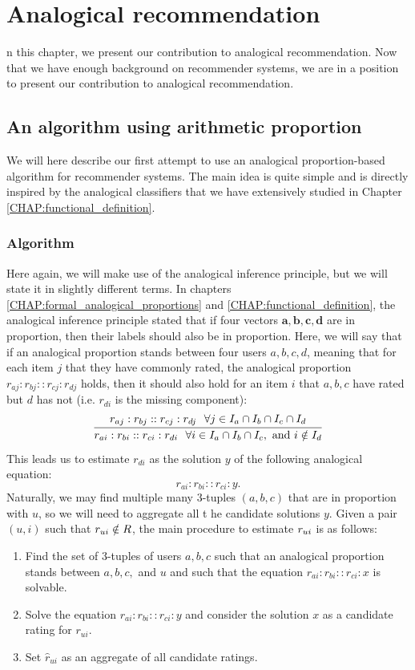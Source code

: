 \chapter{Analogical recommendation}
\label{CHAP:analogical_recommendation}

n this chapter, we present our contribution to analogical
recommendation. Now that we have enough background on recommender systems, we
are in a position to present our contribution to analogical recommendation.  

\section{An algorithm using arithmetic proportion}
\label{SEC:analogical_reco_basic_algo}
We will here describe our first attempt to use an analogical proportion-based
algorithm for recommender systems. The main idea is quite simple and is
directly inspired by the analogical classifiers that we have extensively
studied in Chapter \ref{CHAP:functional_definition}.
\subsection{Algorithm}

Here again, we will make use of the analogical inference principle, but we will
state it in slightly different terms. In chapters
\ref{CHAP:formal_analogical_proportions} and \ref{CHAP:functional_definition},
the analogical inference principle stated that if four vectors $\mathbf{a},
\mathbf{b}, \mathbf{c}, \mathbf{d}$ are in proportion, then their labels should
also be in proportion.  Here, we will say that if an analogical proportion
stands between four users $a, b, c, d$, meaning that for each item $j$ that
they have commonly rated, the analogical proportion $r_{aj} : r_{bj} :: r_{cj}
: r_{dj}$ holds, then it should also hold for an item $i$ that $a, b, c$ have
rated but $d$ has not (i.e. $r_{di}$ is the missing component):
$$
\infer{
r_{ai} : r_{bi} :: r_{ci} : r_{di} ~~ \forall i \in I_a \cap I_b \cap I_c,
\text{ and } i\notin I_d }{r_{aj} : r_{bj} :: r_{cj} : r_{dj} ~~ \forall j \in
I_a \cap I_b \cap I_c \cap  I_d}
$$
This leads us to estimate $r_{di}$ as the solution $y$ of the following
analogical equation:
$$r_{ai} : r_{bi} :: r_{ci} : y.$$
Naturally, we may find multiple many $3$-tuples $(a, b, c)$ that are in proportion with
$u$, so we will need  to aggregate all t he candidate solutions $y$.  Given a
pair $(u,i)$ such that $r_{ui} \notin R$, the main procedure to estimate $r_{ui}$
is as follows:
\begin{enumerate}
\item Find the set of 3-tuples of users $a, b, c$ such that an analogical
  proportion stands between $a, b, c,$ and $u$ and such that the equation
    $r_{ai} : r_{bi} :: r_{ci} : x$ is solvable.
\item Solve the equation $r_{ai} : r_{bi} :: r_{ci} : y$ and consider the
  solution $x$ as a candidate rating for $r_{ui}$.
\item Set $\hat{r}_{ui}$ as an aggregate of all candidate ratings.
\end{enumerate}

